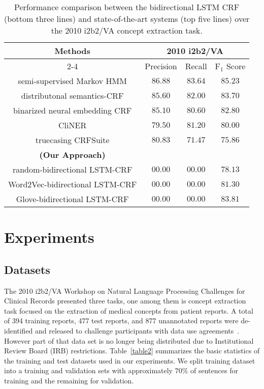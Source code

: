 \documentclass[11pt]{article}
\begin{document}
\begin{table*}[ht]	
	\centering

		\begin{tabular}{|c|c|c|c|}
			\hline
			\multirow{3}{*}{Methods} & 
			\multicolumn{3}{c|}{\bf {\small 2010 i2b2/VA}} \\
			\cline{2-4}
			& Precision & Recall & F$_1$ Score \\
			\hline
			semi-supervised Markov HMM \cite{de2011machine} &$86.88$ &$83.64$ & $85.23$ \\
			distributonal semantics-CRF \cite{jonnalagadda2012enhancing} &$85.60$&$82.00$ &$83.70$  \\	
			binarized neural embedding CRF\cite{wu2015study}&$85.10$&$80.60$ & $82.80$ \\
			CliNER \cite{boagcliner}&$79.50$&$81.20$ & $80.00$ \\
			truecasing CRFSuite \cite{fu2014improving}&$80.83$&$7 1.47$ & $75.86$ \\		
			\hline
			\bf(Our Approach) & & &  \\
			random-bidirectional LSTM-CRF &$00.00$ &$00.00$ & $78.13$ \\
			Word2Vec-bidirectional LSTM-CRF &$00.00$ &$00.00$ & $81.30$ \\
			Glove-bidirectional LSTM-CRF &$00.00$ &$00.00$ & $83.81$ \\
			\hline	
		\end{tabular}
		\caption{Performance comparison between the bidirectional LSTM CRF (bottom three lines) and state-of-the-art systems (top five lines) over the 2010 i2b2/VA concept extraction task.}
		\label{table3}
	\end{table*}



\section{Experiments}

\subsection{Datasets}
\label{sec:length}
The 2010 i2b2/VA Workshop on Natural Language Processing Challenges for Clinical Records presented three tasks, one among them is  concept extraction task focused on the extraction of medical concepts from patient  reports. A total of 394 training reports, 477 test reports, and 877 unannotated reports were de-identified and released to challenge participants with data use agreements~\cite{uzuner20112010}. However part of that data set is no longer being distributed due to Institutional Review Board (IRB) restrictions. Table~\ref{table2} summarizes the basic statistics of the training and test datasets used in our experiments. We split training dataset into a training and validation sets with approximately $70\%$ of sentences for training and the remaining for validation. 
\end{document}
